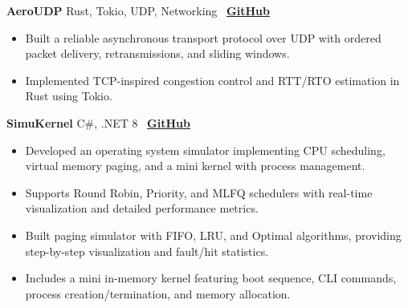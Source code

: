 \documentclass[letterpaper, 11pt]{article}
\begin{document}
\vspace{0.6em}
\textbf{AeroUDP \textbar{}} Rust, Tokio, UDP, Networking
\hfill \faGithub~\textbf{\href{https://github.com/Mo7ammedd/AeroUDP}{GitHub}} \\
\vspace{-0.6em}
\begin{itemize}[leftmargin=1.5em, nosep, itemsep=0.15em]
    \item Built a reliable asynchronous transport protocol over UDP with ordered packet delivery, retransmissions, and sliding windows.
    \item Implemented TCP-inspired congestion control and RTT/RTO estimation in Rust using Tokio.
\end{itemize}


\vspace{0.6em}
\textbf{SimuKernel \textbar{}} C\#, .NET 8
\hfill \faGithub~\textbf{\href{https://github.com/Mo7ammedd/SimuKernel}{GitHub}} \\
\vspace{-0.6em}
\begin{itemize}[leftmargin=1.5em, nosep, itemsep=0.15em]
    \item Developed an operating system simulator implementing CPU scheduling, virtual memory paging, and a mini kernel with process management.
    \item Supports Round Robin, Priority, and MLFQ schedulers with real-time visualization and detailed performance metrics.
    \item Built paging simulator with FIFO, LRU, and Optimal algorithms, providing step-by-step visualization and fault/hit statistics.
    \item Includes a mini in-memory kernel featuring boot sequence, CLI commands, process creation/termination, and memory allocation.
\end{itemize}
\end{document}
